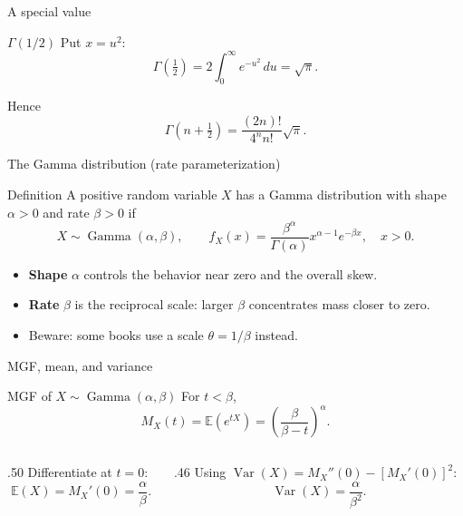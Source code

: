 \documentclass[aspectratio=169,11pt]{beamer}
\newcommand{\E}{\mathbb{E}}
\newcommand{\Var}{\operatorname{Var}}
\newcommand{\GammaDist}{\operatorname{Gamma}}
\begin{document}
\begin{frame}{A special value}
  \begin{block}{$\Gamma(1/2)$}
    Put $x=u^2$:
    \[
      \Gamma\!\left(\tfrac12\right)
      =2\int_0^\infty e^{-u^2}\,du
      =\sqrt{\pi}.
    \]
  \end{block}
  \vspace{.2cm}
  Hence
  \[
    \Gamma\!\left(n+\tfrac12\right)
    =\frac{(2n)!}{4^n n!}\sqrt{\pi}.
  \]
\end{frame}

\begin{frame}{The Gamma distribution (rate parameterization)}
  \begin{block}{Definition}
    A positive random variable $X$ has a Gamma distribution with shape $\alpha>0$ and rate $\beta>0$ if
    \[
      X\sim\GammaDist(\alpha,\beta),\qquad
      f_X(x)=\frac{\beta^\alpha}{\Gamma(\alpha)}x^{\alpha-1}e^{-\beta x},\quad x>0.
    \]
  \end{block}
  \begin{itemize}
    \item \textbf{Shape} $\alpha$ controls the behavior near zero and the overall skew.
    \item \textbf{Rate} $\beta$ is the reciprocal scale: larger $\beta$ concentrates mass closer to zero.
    \item Beware: some books use a scale $\theta=1/\beta$ instead.
  \end{itemize}
\end{frame}

\begin{frame}{MGF, mean, and variance}
  \begin{block}{MGF of $X\sim\GammaDist(\alpha,\beta)$}
    For $t<\beta$,
    \[
      M_X(t)=\E(e^{tX})
      =\left(\frac{\beta}{\beta-t}\right)^\alpha.
    \]
  \end{block}
  \begin{columns}[T]
    \begin{column}{.50\textwidth}
      Differentiate at $t=0$:
      \[
        \E(X)=M_X'(0)=\frac{\alpha}{\beta}.
      \]
    \end{column}
    \begin{column}{.46\textwidth}
      Using $\Var(X)=M_X''(0)-[M_X'(0)]^2$:
      \[
        \Var(X)=\frac{\alpha}{\beta^2}.
      \]
    \end{column}
  \end{columns}
\end{frame}
\end{document}
